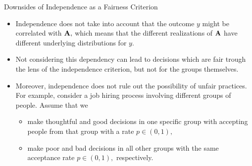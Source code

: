 \begin{vbframe}{Downsides of Independence as a Fairness Criterion}
	\small{
		\begin{itemize}
			\item Independence does not take into account that the outcome $y$ might be correlated with $\mathbf{A},$ which means that the different realizations of $\mathbf{A}$ have different underlying distributions for $y.$
			\item Not considering this dependency can lead to decisions which are fair trough the lens of the independence criterion, but not for the groups themselves. 
%			
			\item Moreover, independence does not rule out the possibility of unfair practices. For example, consider a job hiring process involving different groups of people. Assume that we 
%			
			\begin{itemize}
				\small
%				
				\item make thoughtful and good decisions in one specific group with accepting people from that group with a rate $p\in(0,1),$
%				
				\item make poor and bad decisions in all other groups with the same acceptance rate $p\in(0,1),$ respectively.
%							
			\end{itemize}	
%		
		\end{itemize}
	}
\end{vbframe}


